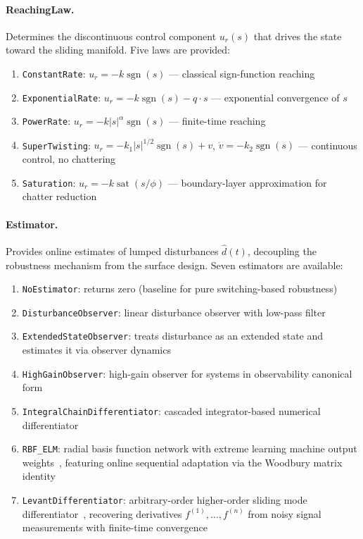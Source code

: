 \documentclass[preprint,12pt]{elsarticle}
\begin{document}
\paragraph{ReachingLaw.} Determines the discontinuous control component $u_r(s)$ that drives the state toward the sliding manifold. Five laws are provided:
\begin{enumerate}
    \item \texttt{ConstantRate}: $u_r = -k\operatorname{sgn}(s)$ --- classical sign-function reaching
    \item \texttt{ExponentialRate}: $u_r = -k\operatorname{sgn}(s) - q \cdot s$ --- exponential convergence of $s$
    \item \texttt{PowerRate}: $u_r = -k|s|^\alpha \operatorname{sgn}(s)$ --- finite-time reaching
    \item \texttt{SuperTwisting}: $u_r = -k_1|s|^{1/2}\operatorname{sgn}(s) + v$, $\dot{v} = -k_2\operatorname{sgn}(s)$ --- continuous control, no chattering~\cite{levant2003higher}
    \item \texttt{Saturation}: $u_r = -k\operatorname{sat}(s/\phi)$ --- boundary-layer approximation for chatter reduction~\cite{edwards1998sliding}
\end{enumerate}

\paragraph{Estimator.} Provides online estimates of lumped disturbances $\hat{d}(t)$, decoupling the robustness mechanism from the surface design. Seven estimators are available:
\begin{enumerate}
    \item \texttt{NoEstimator}: returns zero (baseline for pure switching-based robustness)
    \item \texttt{DisturbanceObserver}: linear disturbance observer with low-pass filter
    \item \texttt{ExtendedStateObserver}: treats disturbance as an extended state and estimates it via observer dynamics
    \item \texttt{HighGainObserver}: high-gain observer for systems in observability canonical form
    \item \texttt{IntegralChainDifferentiator}: cascaded integrator-based numerical differentiator
    \item \texttt{RBF\_ELM}: radial basis function network with extreme learning machine output weights~\cite{huang2006extreme}, featuring online sequential adaptation via the Woodbury matrix identity
    \item \texttt{LevantDifferentiator}: arbitrary-order higher-order sliding mode differentiator~\cite{levant2003higher}, recovering derivatives $f^{(1)}, \ldots, f^{(n)}$ from noisy signal measurements with finite-time convergence
\end{enumerate}
\end{document}
